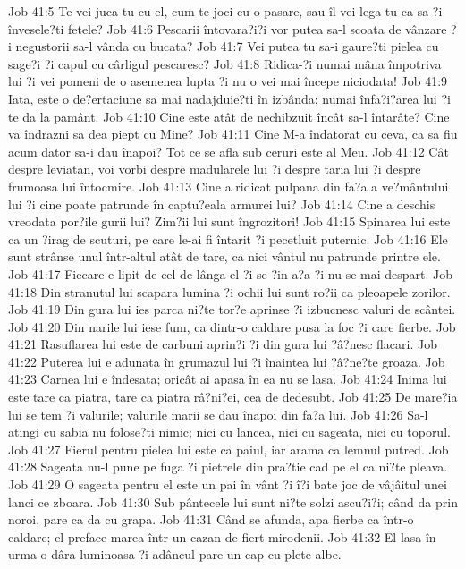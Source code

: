 Job 41:5  Te vei juca tu cu el, cum te joci cu o pasare, sau îl vei lega tu ca sa-?i învesele?ti fetele?
Job 41:6  Pescarii întovara?i?i vor putea sa-l scoata de vânzare ?i negustorii sa-l vânda cu bucata?
Job 41:7  Vei putea tu sa-i gaure?ti pielea cu sage?i ?i capul cu cârligul pescaresc?
Job 41:8  Ridica-?i numai mâna împotriva lui ?i vei pomeni de o asemenea lupta ?i nu o vei mai începe niciodata!
Job 41:9  Iata, este o de?ertaciune sa mai nadajduie?ti în izbânda; numai înfa?i?area lui ?i te da la pamânt.
Job 41:10  Cine este atât de nechibzuit încât sa-l întarâte? Cine va îndrazni sa dea piept cu Mine?
Job 41:11  Cine M-a îndatorat cu ceva, ca sa fiu acum dator sa-i dau înapoi? Tot ce se afla sub ceruri este al Meu.
Job 41:12  Cât despre leviatan, voi vorbi despre madularele lui ?i despre taria lui ?i despre frumoasa lui întocmire.
Job 41:13  Cine a ridicat pulpana din fa?a a ve?mântului lui ?i cine poate patrunde în captu?eala armurei lui?
Job 41:14  Cine a deschis vreodata por?ile gurii lui? Zim?ii lui sunt îngrozitori!
Job 41:15  Spinarea lui este ca un ?irag de scuturi, pe care le-ai fi întarit ?i pecetluit puternic.
Job 41:16  Ele sunt strânse unul într-altul atât de tare, ca nici vântul nu patrunde printre ele.
Job 41:17  Fiecare e lipit de cel de lânga el ?i se ?in a?a ?i nu se mai despart.
Job 41:18  Din stranutul lui scapara lumina ?i ochii lui sunt ro?ii ca pleoapele zorilor.
Job 41:19  Din gura lui ies parca ni?te tor?e aprinse ?i izbucnesc valuri de scântei.
Job 41:20  Din narile lui iese fum, ca dintr-o caldare pusa la foc ?i care fierbe.
Job 41:21  Rasuflarea lui este de carbuni aprin?i ?i din gura lui ?â?nesc flacari.
Job 41:22  Puterea lui e adunata în grumazul lui ?i înaintea lui ?â?ne?te groaza.
Job 41:23  Carnea lui e îndesata; oricât ai apasa în ea nu se lasa.
Job 41:24  Inima lui este tare ca piatra, tare ca piatra râ?ni?ei, cea de dedesubt.
Job 41:25  De mare?ia lui se tem ?i valurile; valurile marii se dau înapoi din fa?a lui.
Job 41:26  Sa-l atingi cu sabia nu folose?ti nimic; nici cu lancea, nici cu sageata, nici cu toporul.
Job 41:27  Fierul pentru pielea lui este ca paiul, iar arama ca lemnul putred.
Job 41:28  Sageata nu-l pune pe fuga ?i pietrele din pra?tie cad pe el ca ni?te pleava.
Job 41:29  O sageata pentru el este un pai în vânt ?i î?i bate joc de vâjâitul unei lanci ce zboara.
Job 41:30  Sub pântecele lui sunt ni?te solzi ascu?i?i; când da prin noroi, pare ca da cu grapa.
Job 41:31  Când se afunda, apa fierbe ca într-o caldare; el preface marea într-un cazan de fiert mirodenii.
Job 41:32  El lasa în urma o dâra luminoasa ?i adâncul pare un cap cu plete albe.
